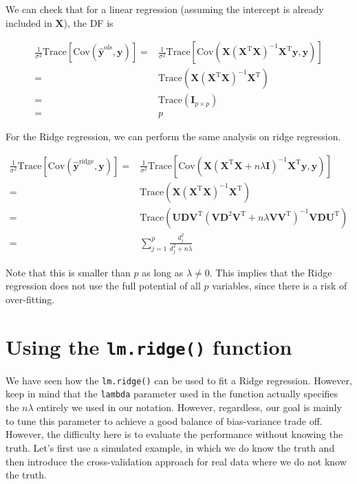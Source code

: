 \documentclass[
]{book}
\theoremstyle{definition}
\theoremstyle{definition}
\theoremstyle{definition}
\theoremstyle{definition}
\theoremstyle{remark}
\begin{document}
We can check that for a linear regression (assuming the intercept is already included in \(\mathbf{X}\)), the DF is

\begin{align}
\frac{1}{\sigma^2} \text{Trace}[\text{Cov}(\widehat{\mathbf{y}}^\text{ols}, \mathbf{y})] =& \frac{1}{\sigma^2} \text{Trace}[\text{Cov}(\mathbf{X}(\mathbf{X}^\text{T}\mathbf{X})^{-1} \mathbf{X}^\text{T}\mathbf{y}, \mathbf{y})] \\
=& \text{Trace}(\mathbf{X}(\mathbf{X}^\text{T}\mathbf{X})^{-1} \mathbf{X}^\text{T}) \\
=& \text{Trace}(\mathbf{I}_{p\times p})\\
=& p
\end{align}

For the Ridge regression, we can perform the same analysis on ridge regression.

\begin{align}
\frac{1}{\sigma^2} \text{Trace}[\text{Cov}(\widehat{\mathbf{y}}^\text{ridge}, \mathbf{y})] =& \frac{1}{\sigma^2} \text{Trace}[\text{Cov}(\mathbf{X}(\mathbf{X}^\text{T}\mathbf{X}+ n \lambda \mathbf{I})^{-1} \mathbf{X}^\text{T}\mathbf{y}, \mathbf{y})] \\
=& \text{Trace}(\mathbf{X}(\mathbf{X}^\text{T}\mathbf{X})^{-1} \mathbf{X}^\text{T}) \\
=& \text{Trace}(\mathbf{U}\mathbf{D}\mathbf{V}^\text{T}( \mathbf{V}\mathbf{D}^2 \mathbf{V}^\text{T}+ n \lambda \mathbf{V}\mathbf{V}^\text{T})^{-1} \mathbf{V}\mathbf{D}\mathbf{U}^\text{T})\\
=& \sum_{j = 1}^p \frac{d_j^2}{d_j^2 + n\lambda}
\end{align}

Note that this is smaller than \(p\) as long as \(\lambda \neq 0\). This implies that the Ridge regression does not use the full potential of all \(p\) variables, since there is a risk of over-fitting.

\hypertarget{using-the-lm.ridge-function}{%
\section{\texorpdfstring{Using the \texttt{lm.ridge()} function}{Using the lm.ridge() function}}\label{using-the-lm.ridge-function}}

We have seen how the \texttt{lm.ridge()} can be used to fit a Ridge regression. However, keep in mind that the \texttt{lambda} parameter used in the function actually specifies the \(n \lambda\) entirely we used in our notation. However, regardless, our goal is mainly to tune this parameter to achieve a good balance of bias-variance trade off. However, the difficulty here is to evaluate the performance without knowing the truth. Let's first use a simulated example, in which we do know the truth and then introduce the cross-validation approach for real data where we do not know the truth.
\end{document}
